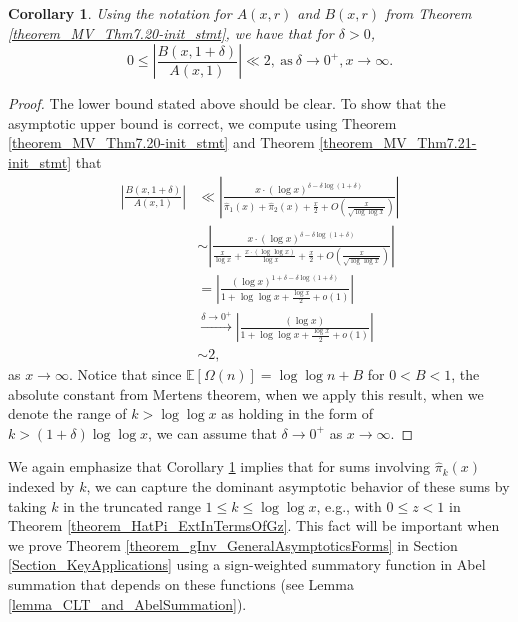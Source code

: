 \documentclass[11pt,reqno,a4letter]{article}
\numberwithin{figure}{section}
\numberwithin{table}{section}
\theoremstyle{plain}
\newtheorem{cor}[theorem]{Corollary}
\numberwithin{theorem}{section}
\theoremstyle{definition}
\begin{document}
\begin{cor} 
\label{theorem_MV_Thm7.20} 
Using the notation for $A(x, r)$ and $B(x, r)$ from 
Theorem \ref{theorem_MV_Thm7.20-init_stmt}, 
we have that for $\delta > 0$, 
\[
0 \leq \left\lvert \frac{B(x, 1+\delta)}{A(x, 1)} \right\rvert \ll 2, 
     \mathrm{\ as\ } \delta \rightarrow 0^{+}, x \rightarrow \infty. 
\]
\end{cor} 
\begin{proof} 
The lower bound stated above should be clear. To show that the asymptotic 
upper bound is correct, we compute using Theorem \ref{theorem_MV_Thm7.20-init_stmt} and 
Theorem \ref{theorem_MV_Thm7.21-init_stmt} that 
\begin{align*} 
\left\lvert \frac{B(x, 1+\delta)}{A(x, 1)} \right\rvert & \ll 
     \left\lvert \frac{x \cdot (\log x)^{\delta - \delta\log(1+\delta)}}{ 
     \widehat{\pi}_1(x) + \widehat{\pi}_2(x) + \frac{x}{2} + 
     O\left(\frac{x}{\sqrt{\log\log x}}\right)} \right\rvert \\ 
     & \sim 
     \left\lvert \frac{x \cdot (\log x)^{\delta - \delta\log(1+\delta)}}{ 
     \frac{x}{\log x} + \frac{x \cdot (\log\log x)}{\log x} + \frac{x}{2} + 
     O\left(\frac{x}{\sqrt{\log\log x}}\right)} \right\rvert \\ 
     & = 
     \left\lvert \frac{(\log x)^{1 + \delta - \delta\log(1+\delta)}}{ 
     1 + \log\log x + \frac{\log x}{2} + o(1)}\right\rvert \\ 
     & \xrightarrow{\delta \rightarrow 0^{+}} 
     \left\lvert \frac{(\log x)}{ 
     1 + \log\log x + \frac{\log x}{2} + o(1)} \right\rvert \\ 
     & \sim 2, 
\end{align*} 
as $x \rightarrow \infty$. Notice that since $\mathbb{E}[\Omega(n)] = \log\log n + B$ for $0 < B < 1$, the 
absolute constant from Mertens theorem, 
when we apply this result, when we denote the range of $k > \log\log x$ as holding in the form of 
$k > (1 + \delta) \log\log x$, we can assume that $\delta \rightarrow 0^{+}$ as 
$x \rightarrow \infty$. 
\end{proof} 

We again emphasize that 
Corollary \ref{theorem_MV_Thm7.20} implies that for sums involving $\widehat{\pi}_k(x)$ indexed by $k$, 
we can capture the dominant asymptotic behavior of these sums by taking $k$ in the truncated range 
$1 \leq k \leq \log\log x$, e.g., with $0 \leq z < 1$ in Theorem \ref{theorem_HatPi_ExtInTermsOfGz}. 
This fact will be important when we prove 
Theorem \ref{theorem_gInv_GeneralAsymptoticsForms} in 
Section \ref{Section_KeyApplications} using a sign-weighted 
summatory function in Abel summation that depends on these functions 
(see Lemma \ref{lemma_CLT_and_AbelSummation}). 
\end{document}
